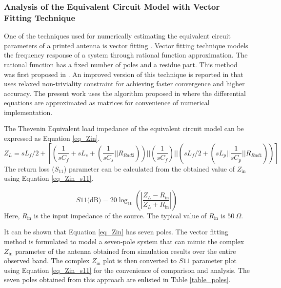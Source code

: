 \subsubsection{Analysis of the Equivalent Circuit Model with Vector Fitting Technique}
One of the techniques used for numerically estimating the equivalent circuit parameters of a printed antenna is vector fitting \cite{vectorfitting1, vectorfitting2, vectorfitting3}. Vector fitting technique models the frequency response of a system through rational function approximation. The rational function has a fixed number of poles and a residue part. This method was first proposed in \cite{vfit3_1}. An improved version of this technique is reported in \cite{vfit3_2} that uses relaxed non-triviality constraint for achieving faster convergence and higher accuracy. The present work uses the algorithm proposed in \cite{vfit3_3} where the differential equations are approximated as matrices for convenience of numerical implementation.

The Thevenin Equivalent load impedance of the equivalent circuit model can be expressed as Equation \ref{eq_Zin}.
{\small
\begin{equation}\label{eq_Zin}
Z_{L} = sL_f/2 + \left[\left(\frac{1}{sC_f}+sL_s+\left(\frac{1}{sC_s} || R_{Rad2}\right)\right) || \left(\frac{1}{sC_f}\right) || \left(sL_f/2 + \left(sL_p || \frac{1}{sC_p} || R_{Rad1}\right)\right)\right]
\end{equation}}
The return loss ($S_{11}$) parameter can be calculated from the obtained value of $Z_{\text{in}}$ using Equation \ref{eq_Zin_s11}.

\begin{equation}\label{eq_Zin_s11}
S11\text{(dB)}=20 \log_{10}{\left(\left|\frac{Z_L - R_{\text{in}}}{Z_L + R_{\text{in}}}\right|\right)}
\end{equation}
Here, $R_{\text{in}}$ is the input impedance of the source. The typical value of $R_{\text{in}}$ is $50~\Omega$.

It can be shown that Equation \ref{eq_Zin} has seven poles. The vector fitting method is formulated to model a seven-pole system that can mimic the complex $Z_{\text{in}}$ parameter of the antenna obtained from simulation results over the entire observed band. The complex $Z_{\text{in}}$ plot is then converted to $S11$ parameter plot using Equation \ref{eq_Zin_s11} for the convenience of comparison and analysis. The seven poles obtained from this approach are enlisted in Table \ref{table_poles}.

